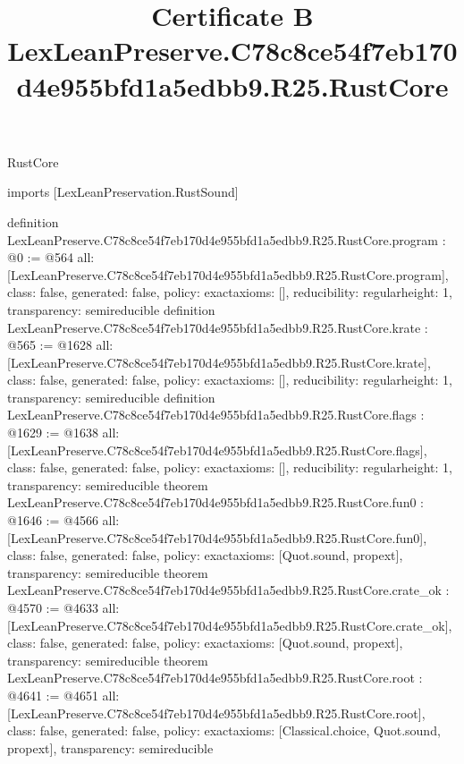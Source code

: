 \begin{lexlean}{RustCore}
\title{Certificate B LexLeanPreserve.C78c8ce54f7eb170d4e955bfd1a5edbb9.R25.RustCore}
\begin{coremodule}
imports [LexLeanPreservation.RustSound]

definition LexLeanPreserve.C78c8ce54f7eb170d4e955bfd1a5edbb9.R25.RustCore.program : @0 := @564 {
  all: [LexLeanPreserve.C78c8ce54f7eb170d4e955bfd1a5edbb9.R25.RustCore.program],
  class: false,
  generated: false,
  policy: exact{axioms: []},
  reducibility: regular{height: 1},
  transparency: semireducible
}
definition LexLeanPreserve.C78c8ce54f7eb170d4e955bfd1a5edbb9.R25.RustCore.krate : @565 := @1628 {
  all: [LexLeanPreserve.C78c8ce54f7eb170d4e955bfd1a5edbb9.R25.RustCore.krate],
  class: false,
  generated: false,
  policy: exact{axioms: []},
  reducibility: regular{height: 1},
  transparency: semireducible
}
definition LexLeanPreserve.C78c8ce54f7eb170d4e955bfd1a5edbb9.R25.RustCore.flags : @1629 := @1638 {
  all: [LexLeanPreserve.C78c8ce54f7eb170d4e955bfd1a5edbb9.R25.RustCore.flags],
  class: false,
  generated: false,
  policy: exact{axioms: []},
  reducibility: regular{height: 1},
  transparency: semireducible
}
theorem LexLeanPreserve.C78c8ce54f7eb170d4e955bfd1a5edbb9.R25.RustCore.fun0 : @1646 := @4566 {
  all: [LexLeanPreserve.C78c8ce54f7eb170d4e955bfd1a5edbb9.R25.RustCore.fun0],
  class: false,
  generated: false,
  policy: exact{axioms: [Quot.sound, propext]},
  transparency: semireducible
}
theorem LexLeanPreserve.C78c8ce54f7eb170d4e955bfd1a5edbb9.R25.RustCore.crate_ok : @4570 := @4633 {
  all: [LexLeanPreserve.C78c8ce54f7eb170d4e955bfd1a5edbb9.R25.RustCore.crate_ok],
  class: false,
  generated: false,
  policy: exact{axioms: [Quot.sound, propext]},
  transparency: semireducible
}
theorem LexLeanPreserve.C78c8ce54f7eb170d4e955bfd1a5edbb9.R25.RustCore.root : @4641 := @4651 {
  all: [LexLeanPreserve.C78c8ce54f7eb170d4e955bfd1a5edbb9.R25.RustCore.root],
  class: false,
  generated: false,
  policy: exact{axioms: [Classical.choice, Quot.sound, propext]},
  transparency: semireducible
}


\end{coremodule}
\end{lexlean}
